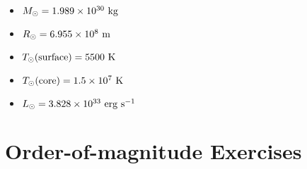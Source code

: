 \begin{itemize}
\item $M_{\odot} = 1.989 \times 10^{30} {\rm ~kg} $
\item $R_{\odot} = 6.955 \times 10^{8} {\rm ~m} $
\item $T_{\odot}{\rm (surface)} = 5500 {\rm ~K} $
\item $T_{\odot}{\rm (core)} = 1.5 \times 10^7 {\rm ~K} $
\item $L_{\odot} = 3.828 \times 10^{33} {\rm ~erg} {\rm ~s}^{-1}$
\end{itemize}

\section{Order-of-magnitude Exercises}

